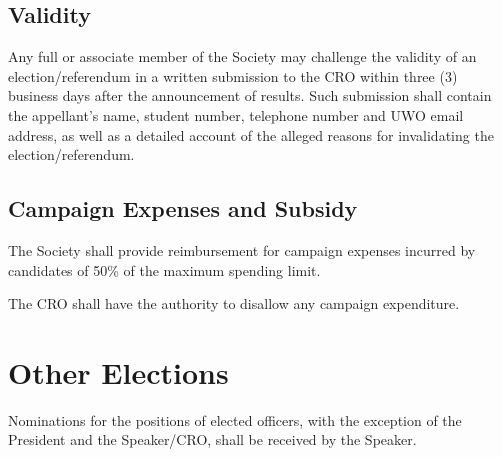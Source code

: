 \subsection{Validity}

\begin{longenum}[ label*=\thesubsection.\arabic*., align=left]
	\item Any full or associate member of the Society may challenge the validity of an election/referendum in a written submission to the CRO within three (3) business days after the announcement of results. Such submission shall contain the appellant's name, student number, telephone number and UWO email address, as well as a detailed account of the alleged reasons for invalidating the election/referendum.
	
\end{longenum}

\subsection{Campaign Expenses and Subsidy}

\begin{longenum}[ label*=\thesubsection.\arabic*., align=left]
	\item The Society shall provide reimbursement for campaign expenses incurred by candidates of 50\% of the maximum spending limit.
    \item The CRO shall have the authority to disallow any campaign expenditure. 
\end{longenum}

\newpage

\section{Other Elections}

 Nominations for the positions of elected officers, with the exception of the President and the Speaker/CRO, shall be received by the Speaker.
 
 		

